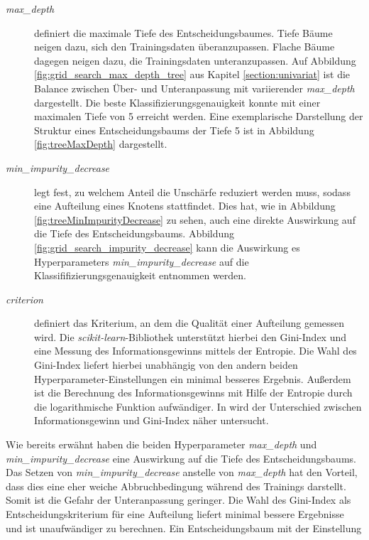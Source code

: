 \begin{description}
	\item[\emph{max\_depth}]
	 definiert die maximale Tiefe des Entscheidungsbaumes. Tiefe Bäume neigen dazu, sich den Trainingsdaten überanzupassen. Flache Bäume dagegen neigen dazu, die Trainingsdaten unteranzupassen. Auf Abbildung \ref{fig:grid_search_max_depth_tree} aus Kapitel \ref{section:univariat} ist die Balance zwischen Über- und Unteranpassung mit variierender \emph{max\_depth} dargestellt. Die beste Klassifizierungsgenauigkeit konnte mit einer maximalen Tiefe von 5 erreicht werden. Eine exemplarische Darstellung der Struktur eines Entscheidungsbaums der Tiefe 5 ist in Abbildung \ref{fig:treeMaxDepth} dargestellt.

	\item[\emph{min\_impurity\_decrease}] 
	legt fest, zu welchem Anteil die Unschärfe reduziert werden muss, sodass eine Aufteilung eines Knotens stattfindet. Dies hat, wie in Abbildung \ref{fig:treeMinImpurityDecrease} zu sehen, auch eine direkte Auswirkung auf die Tiefe des Entscheidungsbaums. Abbildung \ref{fig:grid_search_impurity_decrease} kann die Auswirkung es Hyperparameters \emph{min\_impurity\_decrease}  auf die Klassififizierungsgenauigkeit entnommen werden. 
	
	\item[\emph{criterion}]
	definiert das Kriterium, an dem die Qualität einer Aufteilung gemessen wird. Die \emph{scikit-learn}-Bibliothek unterstützt hierbei den Gini-Index und eine Messung des Informationsgewinns mittels der Entropie. Die Wahl des Gini-Index liefert hierbei unabhängig von den andern beiden Hyperparameter-Einstellungen ein minimal besseres Ergebnis. Außerdem ist die Berechnung des Informationsgewinns mit Hilfe der Entropie durch die logarithmische Funktion aufwändiger. In \cite{gini_entropy} wird der Unterschied zwischen Informationsgewinn und Gini-Index näher untersucht.
\end{description}

Wie bereits erwähnt haben die beiden Hyperparameter \emph{max\_depth} und \emph{min\_impurity\_decrease} eine Auswirkung auf die Tiefe des Entscheidungsbaums. Das Setzen von \emph{min\_impurity\_decrease} anstelle von  \emph{max\_depth} hat den Vorteil, dass dies eine eher weiche Abbruchbedingung während des Trainings darstellt. Somit ist die Gefahr der Unteranpassung geringer. Die Wahl des Gini-Index als Entscheidungskriterium für eine Aufteilung liefert minimal bessere Ergebnisse und ist unaufwändiger zu berechnen. Ein Entscheidungsbaum mit der Einstellung 


